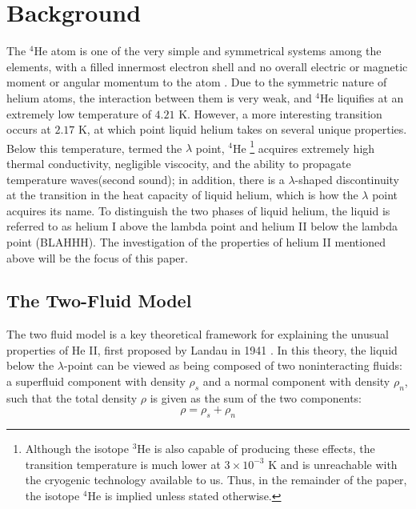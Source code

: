 
\section{Background}\label{background}

The $^4$He atom is one of the very simple and symmetrical systems
among the elements, with a filled innermost electron shell and no
overall electric or magnetic moment or angular momentum to the atom
\cite{atkins}. Due to the symmetric nature of helium atoms, the
interaction between them is very weak, and $^4$He liquifies at an
extremely low temperature of $4.21$ K. However, a more interesting
transition occurs at $2.17$ K, at which point liquid helium takes on
several unique properties. Below this temperature, termed the
$\lambda$ point, $^4$He \footnote{Although the isotope $^3$He is also
  capable of producing these effects, the transition temperature is
  much lower at $3\times 10^{-3}$ K and is unreachable with the
  cryogenic technology available to us. Thus, in the remainder of the
  paper, the isotope $^4$He is implied unless stated otherwise.}
acquires extremely high thermal conductivity, negligible viscocity,
and the ability to propagate temperature waves(second sound); in
addition, there is a $\lambda$-shaped discontinuity at the transition
in the heat capacity of liquid helium, which is how the $\lambda$
point acquires its name. To distinguish the two phases of liquid
helium, the liquid is referred to as helium I above the lambda point
and helium II below the lambda point (BLAHHH). The investigation of
the properties of helium II mentioned above will be the focus of this
paper.

\subsection{The Two-Fluid Model}

The two fluid model is a key theoretical framework for explaining the
unusual properties of He II, first proposed by Landau in 1941
\cite{landau}. In this theory, the liquid below the $\lambda$-point
can be viewed as being composed of two noninteracting fluids: a
superfluid component with density $\rho_s$ and a normal component with
density $\rho_n$, such that the total density $\rho$ is given as the
sum of the two components:
\begin{equation}
\rho = \rho_s + \rho_n
\end{equation}

